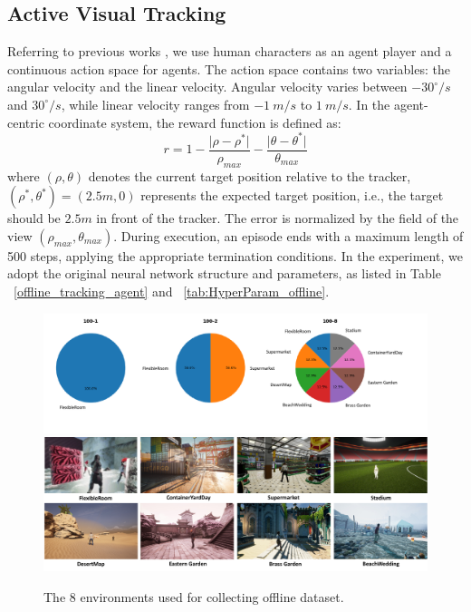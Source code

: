 \subsection{Active Visual Tracking}
\label{app:tracking_task}
Referring to previous works \citep{zhong2024empowering}, we use human characters as an agent player and a continuous action space for agents. The action space contains two variables: the angular velocity and the linear velocity. Angular velocity varies between $-30^{\circ}/s$ and $30^{\circ}/s$, 
while linear velocity ranges from $-1\ m/s$ to $1\ m/s$. In the agent-centric coordinate system, the reward function is defined as:
\begin{equation}
    r = 1- \frac{\vert\rho - \rho^*\vert}{\rho_{max}} - \frac{\vert\theta-\theta^*\vert}{\theta_{max}}
\end{equation}
where $(\rho, \theta)$ denotes the current target position relative to the tracker, $(\rho^*, \theta^*)=(2.5m, 0)$ represents the expected target position, i.e., the target should be $2.5m$ in front of the tracker. The error is normalized by the field of the view $(\rho_{max}, \theta_{max})$. During execution, an episode ends with a maximum length of 500 steps, applying the appropriate termination conditions. In the experiment, we adopt the original neural network structure and parameters, as listed in Table ~\ref{offline_tracking_agent} and ~\ref{tab:HyperParam_offline}. 

\begin{figure}[t]
    \centering
    \includegraphics[width=1\linewidth]{image/data_distribution.pdf}
    \vspace{0.1cm} %
    \includegraphics[width=1\linewidth]{image/training_env.pdf}
    \caption{The 8 environments used for collecting offline dataset.}
    \label{fig:data_distribution}
\end{figure}

